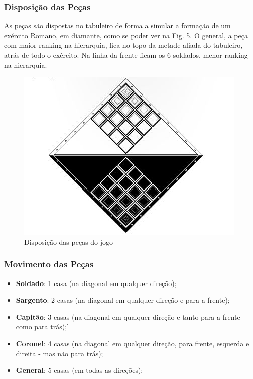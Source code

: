 \documentclass[a4paper]{article}
\begin{document}
\subsubsection{Disposição das Peças}
As peças são dispostas no tabuleiro de forma a simular a formação de um exército Romano, em diamante, como se poder ver na Fig. 5. O general, a peça com maior ranking na hierarquia, fica no topo da metade aliada do tabuleiro, atrás de todo o exército. Na linha da frente ficam os  6 soldados, menor ranking na hierarquia. 

\begin{figure}[h!]
\begin{center}
\includegraphics[scale=0.5]{img/pieces-disposition.jpg}
\caption{Disposição das peças do jogo}
\label{fig:4}
\end{center}
\end{figure}

\newpage

\subsubsection{Movimento das Peças}

\begin{itemize}
	\item \textbf{Soldado}: 1 casa (na diagonal em qualquer direção);
	\item \textbf{Sargento}: 2 casas (na diagonal em qualquer direção e para a frente);
	\item \textbf{Capitão}: 3 casas (na diagonal em qualquer direção e tanto para a frente como para trás);'
	\item \textbf{Coronel}: 4 casas (na diagonal em qualquer direção, para frente, esquerda e direita - mas não para trás);
	\item \textbf{General}: 5 casas (em todas as direções);
\end{itemize}
\end{document}
